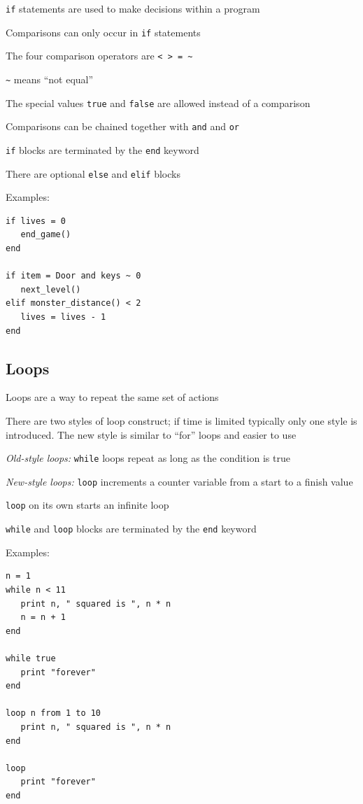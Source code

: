 \documentclass[12pt,a4paper,twoside]{article}
\renewcommand{\_}{\texttt{\symbol{95}}}
\begin{document}
\begin{bulletlist}
\item \verb^if^ statements are used to make decisions within a program
\item Comparisons can only occur in \verb^if^ statements
\item The four comparison operators are \verb^< > = ~^
\item \verb^~^ means ``not equal''
\item The special values \verb^true^ and \verb^false^ are allowed
      instead of a comparison
\item Comparisons can be chained together with \verb^and^ and \verb^or^
\item \verb^if^ blocks are terminated by the \verb^end^ keyword
\item There are optional \verb^else^ and \verb^elif^ blocks
\end{bulletlist}

Examples:
\begin{verbatim}
if lives = 0
   end_game()
end

if item = Door and keys ~ 0
   next_level()
elif monster_distance() < 2
   lives = lives - 1
end
\end{verbatim}

\subsection{Loops}

\begin{bulletlist}
\item Loops are a way to repeat the same set of actions
\item There are two styles of loop construct; if time is limited
	typically only one style is introduced. The new style is similar to
	``for'' loops and easier to use
\item \textit{Old-style loops:} \verb^while^ loops repeat as long as
	the condition is true
\item \textit{New-style loops:} \verb^loop^ increments a counter variable
	from a start to a finish value
\item \verb^loop^ on its own starts an infinite loop
\item \verb^while^ and \verb^loop^ blocks are terminated by the \verb^end^
	keyword
\end{bulletlist}

Examples:
\begin{verbatim}
n = 1
while n < 11
   print n, " squared is ", n * n
   n = n + 1
end

while true
   print "forever"
end

loop n from 1 to 10
   print n, " squared is ", n * n
end

loop
   print "forever"
end
\end{verbatim}
\end{document}

